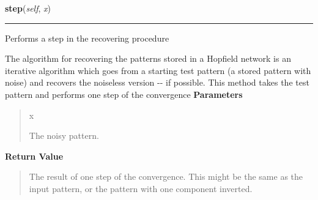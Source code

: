 \hspace{.8\funcindent}\begin{boxedminipage}{\funcwidth}

    \raggedright \textbf{step}(\textit{self}, \textit{x})

    \vspace{-1.5ex}

    \rule{\textwidth}{0.5\fboxrule}
\setlength{\parskip}{2ex}

Performs a step in the recovering procedure

The algorithm for recovering the patterns stored in a Hopfield network
is an iterative algorithm which goes from a starting test pattern (a
stored pattern with noise) and recovers the noiseless version -{}- if
possible. This method takes the test pattern and performs one step of
the convergence
\setlength{\parskip}{1ex}
      \textbf{Parameters}
      \vspace{-1ex}

      \begin{quote}
        \begin{Ventry}{x}

          \item[x]


The noisy pattern.
        \end{Ventry}

      \end{quote}

      \textbf{Return Value}
    \vspace{-1ex}

      \begin{quote}

The result of one step of the convergence. This might be the same as
the input pattern, or the pattern with one component inverted.
      \end{quote}

    \end{boxedminipage}

    \vspace{0.5ex}


